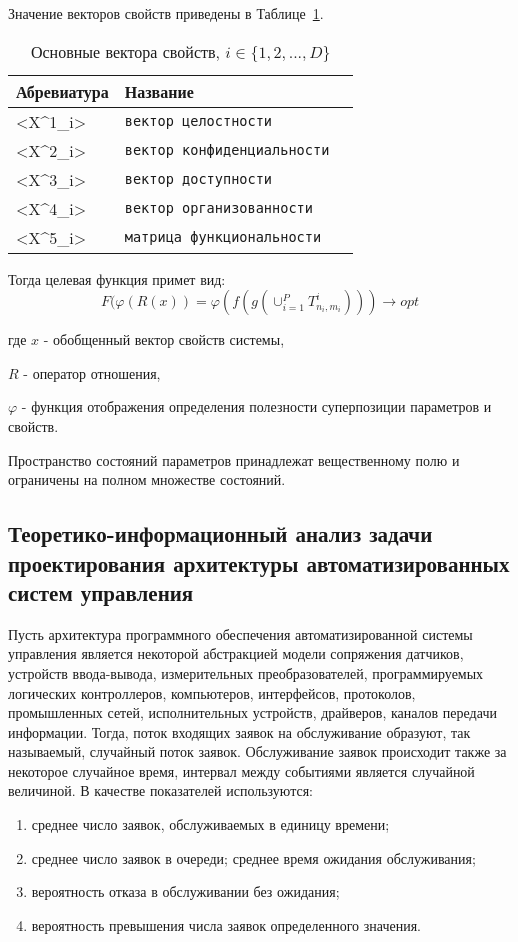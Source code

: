 Значение векторов свойств приведены в Таблице~\cref{tab:X:prop}.
\begin{table}
    \centering
    \captionsetup{justification=centering} %
    \caption{Основные вектора свойств, $i \in \{1, 2, ..., D\}$}\label{tab:X:prop}
    \begin{tabular}{llc}
        \toprule
        Абревиатура  & Название   \\
        \midrule
        <X^1_i>    & \verb|вектор целостности|\\
        <X^2_i>   & \verb|вектор конфиденциальности|\\
        <X^3_i>   & \verb|вектор доступности|\\
        <X^4_i> & \verb|вектор организованности|\\
        <X^5_i>      & \verb|матрица функциональности|\\
        \bottomrule
    \end{tabular}
\end{table}
Тогда целевая функция примет вид:
\begin{equation}
    \label{eq:equation8}
    F(\varphi(R(x)) = \varphi(f(g(\cup^P_{i=1}T^i_{n_i,m_i}))) \rightarrow opt
\end{equation}

где $x$ - обобщенный вектор свойств системы,

$R$ - оператор отношения,

$\varphi$ - функция отображения определения полезности суперпозиции параметров и свойств.

Пространство состояний параметров принадлежат вещественному полю и ограничены на полном множестве состояний.


\subsection{Теоретико-информационный анализ задачи проектирования архитектуры автоматизированных систем управления}\label{sec:ch1/sec5/sub2}
Пусть архитектура программного обеспечения автоматизированной системы управления является некоторой абстракцией модели сопряжения датчиков, устройств ввода-вывода, измерительных преобразователей, программируемых логических контроллеров, компьютеров, интерфейсов, протоколов, промышленных сетей, исполнительных устройств, драйверов, каналов передачи информации. 
Тогда, поток входящих заявок на обслуживание образуют, так называемый, случайный поток заявок. Обслуживание заявок происходит также за некоторое случайное время, интервал между событиями является случайной величиной. В качестве показателей используются: 
\begin{enumerate}
\item  среднее число заявок, обслуживаемых в единицу времени; 
\item  среднее число заявок в очереди; среднее время ожидания обслуживания; 
\item  вероятность отказа в обслуживании без ожидания; 
\item  вероятность превышения числа заявок определенного значения. 
\end{enumerate}

